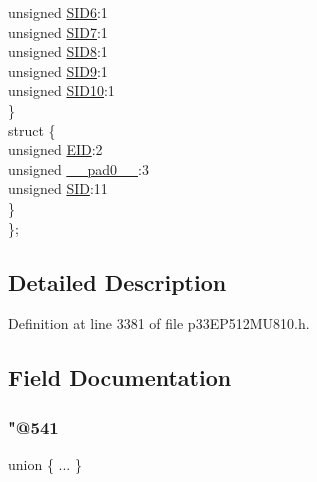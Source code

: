 \begin{DoxyCompactItemize}
\begin{tabbing}
\>\>unsigned \hyperlink{structtag_c1_r_x_m0_s_i_d_b_i_t_s_a70d70952133eb2389d5c326f9f0e8035}{SID6}:1\\
\>\>unsigned \hyperlink{structtag_c1_r_x_m0_s_i_d_b_i_t_s_a34097fb76decd431701fa2d86a22328e}{SID7}:1\\
\>\>unsigned \hyperlink{structtag_c1_r_x_m0_s_i_d_b_i_t_s_afe74894633244fdb0b0c01b4e8c522e7}{SID8}:1\\
\>\>unsigned \hyperlink{structtag_c1_r_x_m0_s_i_d_b_i_t_s_a33587704948067005c2a6a3ccc503c99}{SID9}:1\\
\>\>unsigned \hyperlink{structtag_c1_r_x_m0_s_i_d_b_i_t_s_a1a9084031c7f5fb16007feeebf0d8216}{SID10}:1\\
\>\} \\
\>struct \{\\
\>\>unsigned \hyperlink{structtag_c1_r_x_m0_s_i_d_b_i_t_s_ae80b378c9141f7c03e0b4e55b5f4b54d}{EID}:2\\
\>\>unsigned \hyperlink{structtag_c1_r_x_m0_s_i_d_b_i_t_s_adf71f3d8410c1f1dbbc96680a92c49af}{\_\_pad0\_\_}:3\\
\>\>unsigned \hyperlink{structtag_c1_r_x_m0_s_i_d_b_i_t_s_af88edf93b2fee2432665bd84f51287e4}{SID}:11\\
\>\} \\
\}; \\

\end{tabbing}\end{DoxyCompactItemize}


\subsection{Detailed Description}


Definition at line 3381 of file p33\+E\+P512\+M\+U810.\+h.



\subsection{Field Documentation}
\mbox{\label{structtag_c1_r_x_m0_s_i_d_b_i_t_s_a6c7d1ee1da5657d6ab9a50a328fbbab7}} 
\subsubsection{\texorpdfstring{"@541}{@541}}
{\footnotesize\ttfamily union \{ ... \} }

\mbox{\label{structtag_c1_r_x_m0_s_i_d_b_i_t_s_adf71f3d8410c1f1dbbc96680a92c49af}} 
